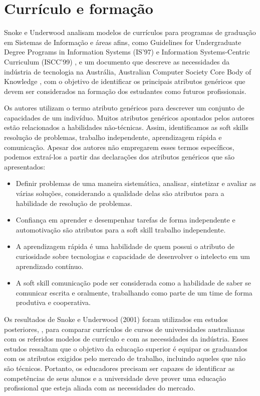 \section{Currículo e formação}
\label{sec:curriculos}

Snoke e Underwood \cite{snoke:01} analisam modelos de currículos para programas de graduação em Sistemas de Informação e áreas afins,
como  Guidelines for Undergraduate Degree Programs in Information Systems (IS’97) \cite{is97}
e     Information Systems-Centric Curriculum (ISCC'99) \cite{iscc99},
e um documento que descreve as necessidades da indústria de tecnologia na Austrália,
Australian Computer Society Core Body of Knowledge \cite{acs},
com o objetivo de identificar os principais atributos genéricos que devem ser considerados na formação dos estudantes como futuros profissionais.

Os autores utilizam o termo atributo genéricos para descrever um conjunto de capacidades de um indivíduo. Muitos atributos genéricos apontados pelos autores estão relacionados a habilidades não-técnicas. Assim, identificamos as soft skills resolução de problemas, trabalho independente, aprendizagem rápida e comunicação. Apesar dos autores não empregarem esses termos específicos, podemos extraí-los a partir das declarações dos atributos genéricos que são apresentados:

\begin{itemize}
	\item Definir problemas de uma maneira sistemática, analisar, sintetizar e avaliar as várias soluções, considerando a qualidade delas são atributos para a habilidade de resolução de problemas.
	\item Confiança em aprender e desempenhar tarefas de forma independente e automotivação são atributos para a soft skill trabalho independente.
	\item	A aprendizagem rápida é uma habilidade de quem possui o atributo de curiosidade sobre tecnologias e capacidade de desenvolver o intelecto em um aprendizado contínuo.
	\item	A soft skill comunicação pode ser considerada como a habilidade de saber se comunicar escrita e oralmente, trabalhando como parte de um time de forma produtiva e cooperativa.
\end{itemize}

Os resultados de Snoke e Underwood (2001)\nocite{snoke:01} foram utilizados em estudos posteriores, \cite{snoke:02, snoke:03}, para comparar currículos de cursos de universidades australianas com os referidos modelos de currículo e com as necessidades da indústria. 
Esses estudos ressaltam que o objetivo da educação superior é equipar os graduandos com os atributos exigidos pelo mercado de trabalho, incluindo aqueles que não são técnicos. Portanto, os educadores precisam ser capazes de identificar as competências de seus alunos e a universidade deve prover uma educação profissional que esteja aliada com as necessidades do mercado.

